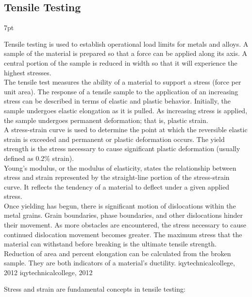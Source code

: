 \documentclass{article}
\newcommand{\formalsource}{} %
\newenvironment{formal}[1][]{%
    \renewcommand{\formalsource}{#1}%
    \def\FrameCommand{%
        \hspace{1pt}%
        {\color{gray}\vrule width 2pt}%
        {\color{white}\vrule width 4pt}%
        \colorbox{white}%
    }%
    \MakeFramed{\advance\hsize-\width\FrameRestore}%
    \noindent\hspace{-4.55pt}%
    \begin{adjustwidth}{}{7pt}%
        \vspace{2pt}%
    }%
    {%
        \vspace{4pt}%
        \ifx\formalsource\empty %
        \else
        \hfill{\footnotesize{\formalsource}}%
        \fi
    \end{adjustwidth}\endMakeFramed%
}
\begin{document}
    \newpage

    \subsection{Tensile Testing}\label{tt}
    
    \begin{formal}[iqytechnicalcollege, 2012]
        Tensile testing is used to establish operational load limits for metals and alloys. A sample of the material is prepared so that a force can be applied along its axis. A central portion of the sample is reduced in width so that it will experience the highest stresses.\\[8pt]
        The tensile test measures the ability of a material to support a stress (force per unit area). The response of a tensile sample to the application of an increasing stress can be described in terms of elastic and plastic behavior. Initially, the sample undergoes elastic elongation as it is pulled. As increasing stress is applied, the sample undergoes permanent deformation; that is, plastic strain.\\[8pt]
        A stress-strain curve is used to determine the point at which the reversible elastic strain is exceeded and permanent or plastic deformation occurs. The yield strength is the stress necessary to cause significant plastic deformation (usually defined as 0.2\% strain).\\[8pt]
        Young’s modulus, or the modulus of elasticity, states the relationship between stress and strain represented by the straight-line portion of the stress-strain curve. It reflects the tendency of a material to deflect under a given applied stress.\\[8pt]
        Once yielding has begun, there is significant motion of dislocations within the metal grains. Grain boundaries, phase boundaries, and other dislocations hinder their movement. As more obstacles are encountered, the stress necessary to cause continued dislocation movement becomes greater. The maximum stress that the material can withstand before breaking is the ultimate tensile strength.\\[8pt]
        Reduction of area and percent elongation can be calculated from the broken sample. They are both indicators of a material’s ductility.
        \end{formal}

     Stress and strain are fundamental concepts in tensile testing:\\[8pt]
\end{document}
